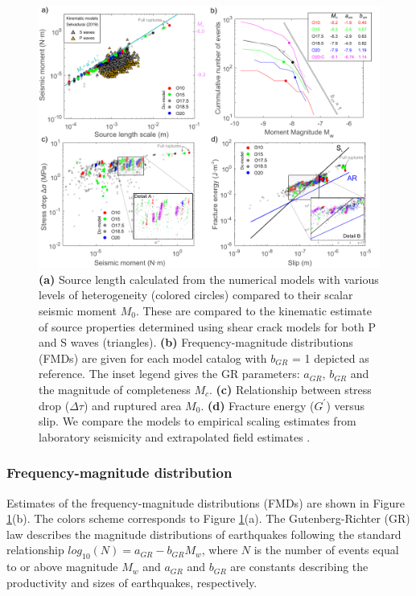 \documentclass[preprint,1p, 10pt,authoryear]{elsarticle}
\begin{document}
\begin{figure}
	\centering
	\includegraphics[scale = 0.95]{FIG10_revised.pdf} 
	\caption{\textbf{(a)} Source length calculated from the numerical models with various levels of heterogeneity (colored circles) compared to their scalar seismic moment $M_{0}$. These are compared to the kinematic estimate of source properties determined using shear crack models \citet{Selvadurai2019} for both P and S waves (triangles). \textbf{(b)} Frequency-magnitude distributions (FMDs) are given for each model catalog with $b_{GR}$ = 1 depicted as reference. The inset legend gives the GR parameters: $a_{GR}$, $b_{GR}$ and the magnitude of completeness $M_{c}$. \textbf{(c)} Relationship between stress drop ($\Delta\tau$) and ruptured area $M_{0}$. \textbf{(d)} Fracture energy ($G^{'}$) versus slip. We compare the models to empirical scaling estimates from laboratory seismicity \citep[black line,][]{Selvadurai2019} and extrapolated field estimates \citep[blue line][]{Abercrombie2005}.}
	\label{fig10}
\end{figure}

\subsubsection{Frequency-magnitude distribution}
Estimates of the frequency-magnitude distributions (FMDs) are shown in Figure \ref{fig10}(b). The colors scheme corresponds to Figure \ref{fig10}(a). The Gutenberg-Richter (GR) law describes the magnitude distributions of earthquakes following the standard relationship $log_{10}(N)= a_{GR} - b_{GR}M_{w}$, where $N$ is the number of events equal to or above magnitude $M_{w}$ and $a_{GR}$ and $b_{GR}$ are constants describing the productivity and sizes of earthquakes, respectively\cite[e.g.][]{Wiemer2002}.  
\end{document}
